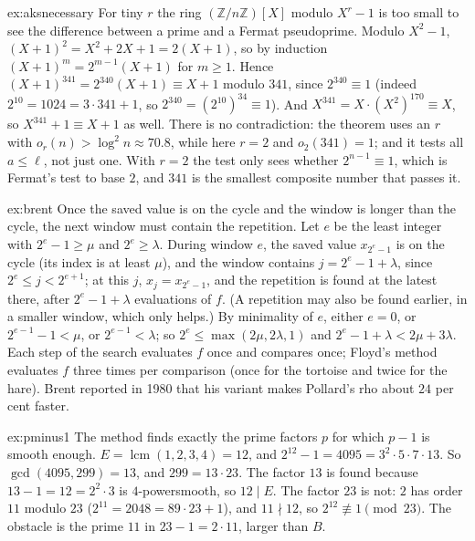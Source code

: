 \begin{solution}{ex:aksnecessary}
\idea For tiny $r$ the ring $(\mathbb Z/n\mathbb Z)[X]$ modulo $X^r-1$ is too small to see the difference between a prime and a Fermat pseudoprime.
\writeup Modulo $X^2-1$, $(X+1)^2=X^2+2X+1=2(X+1)$, so by induction $(X+1)^m=2^{m-1}(X+1)$ for $m\ge1$. Hence $(X+1)^{341}=2^{340}(X+1)\equiv X+1$ modulo $341$, since $2^{340}\equiv1$ (indeed $2^{10}=1024=3\cdot341+1$, so $2^{340}=(2^{10})^{34}\equiv1$). And $X^{341}=X\cdot(X^2)^{170}\equiv X$, so $X^{341}+1\equiv X+1$ as well.
There is no contradiction: the theorem uses an $r$ with $o_r(n)>\log^2n\approx70.8$, while here $r=2$ and $o_2(341)=1$; and it tests all $a\le\ell$, not just one. With $r=2$ the test only sees whether $2^{n-1}\equiv1$, which is Fermat's test to base $2$, and $341$ is the smallest composite number that passes it.
\end{solution}

\begin{solution}{ex:brent}
\idea Once the saved value is on the cycle and the window is longer than the cycle, the next window must contain the repetition.
\writeup Let $e$ be the least integer with $2^e-1\ge\mu$ and $2^e\ge\lambda$. During window $e$, the saved value $x_{2^e-1}$ is on the cycle (its index is at least $\mu$), and the window contains $j=2^e-1+\lambda$, since $2^e\le j<2^{e+1}$; at this $j$, $x_j=x_{2^e-1}$, and the repetition is found at the latest there, after $2^e-1+\lambda$ evaluations of $f$. (A repetition may also be found earlier, in a smaller window, which only helps.)
By minimality of $e$, either $e=0$, or $2^{e-1}-1<\mu$, or $2^{e-1}<\lambda$; so $2^e\le\max(2\mu,2\lambda,1)$ and $2^e-1+\lambda<2\mu+3\lambda$. Each step of the search evaluates $f$ once and compares once; Floyd's method evaluates $f$ three times per comparison (once for the tortoise and twice for the hare). Brent reported in 1980 that his variant makes Pollard's rho about $24$ per cent faster.
\end{solution}

\begin{solution}{ex:pminus1}
\idea The method finds exactly the prime factors $p$ for which $p-1$ is smooth enough.
\writeup $E=\operatorname{lcm}(1,2,3,4)=12$, and $2^{12}-1=4095=3^2\cdot5\cdot7\cdot13$. So $\gcd(4095,299)=13$, and $299=13\cdot23$. The factor $13$ is found because $13-1=12=2^2\cdot3$ is $4$-powersmooth, so $12\mid E$. The factor $23$ is not: $2$ has order $11$ modulo $23$ ($2^{11}=2048=89\cdot23+1$), and $11\nmid12$, so $2^{12}\not\equiv1\pmod{23}$. The obstacle is the prime $11$ in $23-1=2\cdot11$, larger than $B$.
\end{solution}

